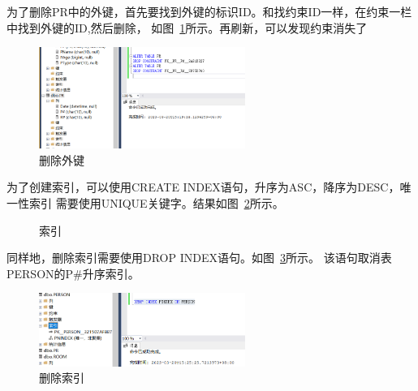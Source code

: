 \documentclass[a4paper,twoside]{article}
\begin{document}
\begin{spacing}{1.2}
为了删除PR中的外键，首先要找到外键的标识ID。和找约束ID一样，在约束一栏中找到外键的ID,然后删除，
如图~\ref{fig:delfkey}所示。再刷新，可以发现约束消失了
\begin{figure}[htbp]
    \centering
    \caption{删除外键}
    \label{fig:delfkey}
    \includegraphics[width=0.6\textwidth]{fkey.png}
\end{figure}

\clearpage

为了创建索引，可以使用CREATE INDEX语句，升序为ASC，降序为DESC，唯一性索引
需要使用UNIQUE关键字。结果如图~\ref{fig:sqlindex}所示。
\begin{figure}[htbp]
    \centering
    \caption{索引}
    \label{fig:sqlindex}
\end{figure}

同样地，删除索引需要使用DROP INDEX语句。如图~\ref{fig:dropindex}所示。
该语句取消表PERSON的P\#升序索引。
\begin{figure}[htbp]
    \centering
    \caption{删除索引}
    \label{fig:dropindex}
    \includegraphics[width=0.6\textwidth]{dropindex.png}
\end{figure}


\end{spacing}
\end{document}
